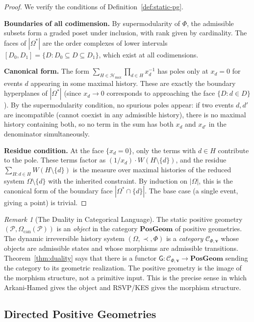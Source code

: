 \documentclass[12pt, oneside]{amsart}
\theoremstyle{plain}
\theoremstyle{definition}
\theoremstyle{remark}
\newtheorem{remark}[theorem]{Remark}
\newcommand{\Phif}{\Phi}   %
\newcommand{\OmKS}{\Omega}
\newcommand{\CF}{\Omega_{\mathrm{can}}}
\newcommand{\PG}{\mathbf{PosGeom}}
\newcommand{\Ccat}{\mathcal{C}_{\Phi,\mathbf{v}}}
\newcommand{\Gfun}{\mathsf{G}}
\newcommand{\Hmax}{\mathcal{H}_{\max}}
\begin{document}
\begin{proof}
We verify the conditions of Definition~\ref{def:static-pg}.

\textbf{Boundaries of all codimension.} By supermodularity of $\Phif$, the admissible subsets form a graded poset under inclusion, with rank given by cardinality. The faces of $|\OmKS^*|$ are the order complexes of lower intervals $[D_0, D_1] = \{D : D_0 \subseteq D \subseteq D_1\}$, which exist at all codimensions.

\textbf{Canonical form.} The form $\sum_{H \in \Hmax} \prod_{d \in H} x_d^{-1}$ has poles only at $x_d = 0$ for events $d$ appearing in some maximal history. These are exactly the boundary hyperplanes of $|\OmKS^*|$ (since $x_d \to 0$ corresponds to approaching the face $\{D : d \in D\}$). By the supermodularity condition, no spurious poles appear: if two events $d, d'$ are incompatible (cannot coexist in any admissible history), there is no maximal history containing both, so no term in the sum has both $x_d$ and $x_{d'}$ in the denominator simultaneously.

\textbf{Residue condition.} At the face $\{x_d = 0\}$, only the terms with $d \in H$ contribute to the pole. These terms factor as $(1/x_d) \cdot W(H \setminus \{d\})$, and the residue $\sum_{H: d \in H} W(H \setminus \{d\})$ is the measure over maximal histories of the reduced system $\OmKS \setminus \{d\}$ with the inherited constraint. By induction on $|\OmKS|$, this is the canonical form of the boundary face $|\OmKS^* \cap \{d\}|$. The base case (a single event, giving a point) is trivial.
\end{proof}

\begin{remark}[The Duality in Categorical Language]
The static positive geometry $(\mathcal{P}, \CF(\mathcal{P}))$ is an \emph{object} in the category $\PG$ of positive geometries. The dynamic irreversible history system $(\OmKS, \prec, \Phif)$ is a \emph{category} $\Ccat$ whose objects are admissible states and whose morphisms are admissible transitions. Theorem~\ref{thm:duality} says that there is a functor $\Gfun: \Ccat \to \PG$ sending the category to its geometric realization. The positive geometry is the image of the morphism structure, not a primitive input. This is the precise sense in which Arkani-Hamed gives the object and RSVP/KES gives the morphism structure.
\end{remark}

\subsection{Directed Positive Geometries}
\end{document}
